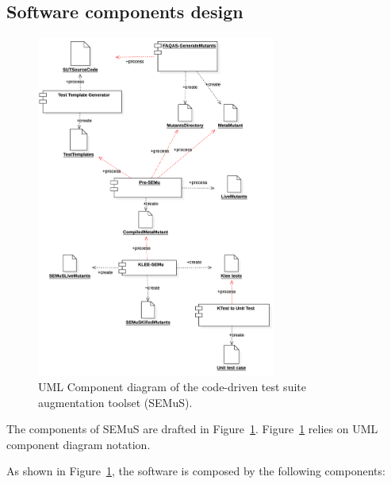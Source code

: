 \subsection{Software components design}
\label{sec:component:design:semus}

\begin{figure}[tb]
  \centering
  \includegraphics[width=0.7\textwidth]{images/semus-component.pdf}
      \caption{UML Component diagram of the code-driven test suite augmentation toolset (SEMuS).}
      \label{fig:component_diagram_semus}
\end{figure}


The components of SEMuS are drafted in Figure~\ref{fig:component_diagram_semus}. Figure~\ref{fig:component_diagram_semus} relies on UML component diagram notation.

As shown in Figure~\ref{fig:component_diagram_semus}, the software is composed by the following components:

